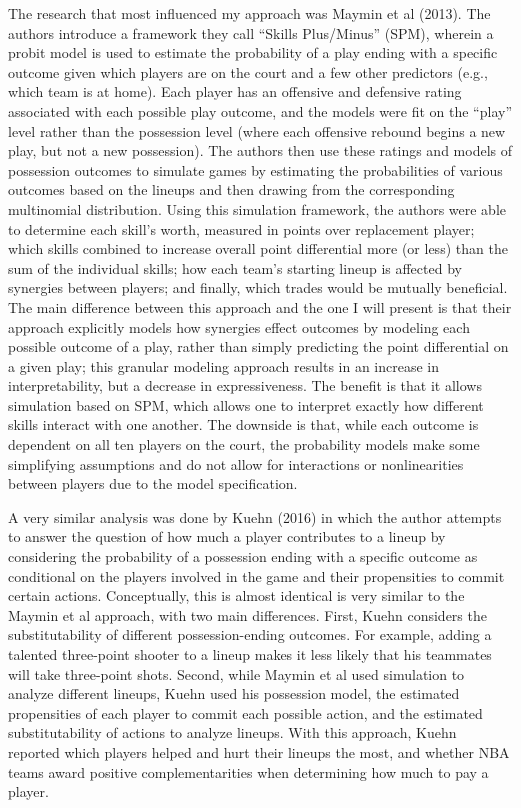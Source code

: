 The research that most influenced my approach was Maymin et al (2013). The authors
introduce a framework they call ``Skills Plus/Minus'' (SPM), wherein a probit model
is used to estimate the probability of a play ending with a specific outcome given
which players are on the court and a few other predictors (e.g., which team is at
home). Each player has an offensive and defensive rating associated with each
possible play outcome, and the models were fit on the ``play'' level rather than the
possession level (where each offensive rebound begins a new play, but not a new
possession). The authors then use these ratings and models of possession outcomes to
simulate games by estimating the probabilities of various outcomes based on the
lineups and then drawing from the corresponding multinomial distribution. Using this
simulation framework, the authors were able to determine each skill's worth,
measured in points over replacement player; which skills combined to increase
overall point differential more (or less) than the sum of the individual skills; how
each team’s starting lineup is affected by synergies between players; and finally,
which trades would be mutually beneficial. The main difference between this approach
and the one I will present is that their approach explicitly models how synergies
effect outcomes by modeling each possible outcome of a play, rather than simply
predicting the point differential on a given play; this granular modeling approach
results in an increase in interpretability, but a decrease in expressiveness. The
benefit is that it allows simulation based on SPM, which allows one to interpret
exactly how different skills interact with one another. The downside is that, while
each outcome is dependent on all ten players on the court, the probability models
make some simplifying assumptions and do not allow for interactions or
nonlinearities between players due to the model specification.

A very similar analysis was done by Kuehn (2016) in which the author attempts to
answer the question of how much a player contributes to a lineup by considering the
probability of a possession ending with a specific outcome as conditional on the
players involved in the game and their propensities to commit certain actions.
Conceptually, this is almost identical is very similar to the Maymin et al approach,
with two main differences. First, Kuehn considers the substitutability of different
possession-ending outcomes. For example, adding a talented three-point shooter to a
lineup makes it less likely that his teammates will take three-point shots. Second,
while Maymin et al used simulation to analyze different lineups, Kuehn used his
possession model, the estimated propensities of each player to commit each possible
action, and the estimated substitutability of actions to analyze lineups. With this
approach, Kuehn reported which players helped and hurt their lineups the most, and
whether NBA teams award positive complementarities when determining how much to pay
a player.

